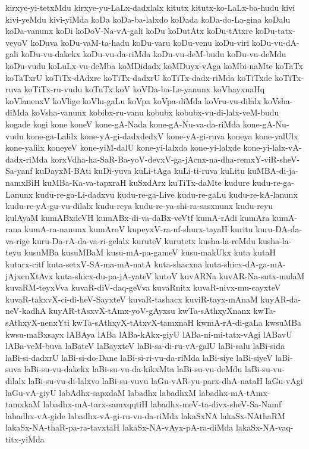 {kirxye-yi-tetxMdu
kirxye-yu-LaLx-dadxlalx
kitutx
kitutx-ko-LaLx-ba-hudu
kivi
kivi-yeMdu
kivi-yiMda
koDa
koDa-ba-lalxdo
koDada
koDa-do-La-gina
koDalu
koDa-vanunx
koDi
koDoV-Na-vA-gali
koDu
koDutAtx
koDu-tAtxre
koDu-tatx-veyoV
koDuva
koDu-vaM-ta-hadu
koDu-varu
koDu-venu
koDu-viri
koDu-vu-dA-gali
koDu-vu-dakekx
koDu-vu-da-riMda
koDu-vu-deM-budu
koDu-vu-deMdu
koDu-vudu
koLuLx-vu-deMba
koMDidadx
koMDuyx-vAga
koMbi-naMte
koTaTx
koTaTxrU
koTiTx-dAdxre
koTiTx-dadxrU
koTiTx-dadx-riMda
koTiTxde
koTiTx-ruva
koTiTx-ru-vudu
koTuTx
koV
koVDa-ba-Le-yanunx
koVhayxnaHq
koVlanenxV
koVlige
koVlu-gaLu
koVpa
koVpa-diMda
koVru-vu-dilalx
koVsha-diMda
koVsha-vanunx
kobibx-ru-vanu
kobubx
kobubx-vu-di-lalx-veM-budu
kogade
kogi
kone
koneV
kone-gA-Nada
kone-gA-Nu-va-da-riMda
kone-gA-Nu-vudu
kone-ga-Lalilx
kone-yA-gi-dadxdedxV
kone-yA-gi-ruva
koneya
kone-yalUlx
kone-yalilx
koneyeV
kone-yiM-dalU
kone-yi-lalxda
kone-yi-lalxde
kone-yi-lalx-vA-dadx-riMda
korxVdha-ha-SaR-Ba-yoV-devxV-ga-jAcnx-na-dha-remxY-viR-sheV-Sa-yanf
kuDayxM-BAti
kuDi-yuva
kuLi-tAga
kuLi-ti-ruva
kuLitu
kuMBA-di-ja-namxBiH
kuMBa-Ka-va-tapxraH
kuSxdArx
kuTiTx-daMte
kudure
kudu-re-ga-Lanunx
kudu-re-ga-Li-dadxvu
kudu-re-ga-Live
kudu-re-gaLu
kudu-re-kA-lanunx
kudu-re-yA-gu-vu-dilalx
kudu-reya
kudu-re-ya-shi-ra-sasxnunx
kudu-reyu
kulAyaM
kumABxdeVH
kumABx-di-va-daBx-veVtf
kumA-rAdi
kumAra
kumA-rana
kumA-ra-nanunx
kumAroV
kupeyxV-ra-nf-shurx-tayaH
kuritu
kuru-DA-da-va-rige
kuru-Da-rA-da-va-ri-gelalx
kuruteV
kurutetx
kusha-la-reMdu
kusha-la-teyu
kusuMBa
kusuMBaM
kusu-mA-pa-gameV
kusu-makUkx
kuta
kutaH
kutarx-citf
kuta-setxV-SA-ma-mA-natA
kuta-shacxna
kuta-shicx-dA-ga-mA-jAjxcnXtAvx
kuta-shicx-du-pa-jA-yateV
kutoV
kuvARNa
kuvAR-Na-sutx-mulaM
kuvaRM-teyxVva
kuvaR-diV-daq-geVva
kuvaRnitx
kuvaR-nivx-mu-cayxteV
kuvaR-takxvX-ci-di-heV-SayxteV
kuvaR-tashacx
kuviR-tayx-mAnaM
kuyAR-da-neV-kadhA
kuyAR-tAsxvX-tAmx-yoV-gAyxsu
kwTa-sAthxyXnanx
kwTa-sAthxyX-nenxYti
kwTa-sAthxyX-tAtxvX-tamxnaH
kwmA-rA-di-gaLa
kwsuMBa
kwsu-maBxsayx
lABAya
lABa
lABa-kAkx-giyU
lABa-ni-mi-tatx-vAgi
lABavU
lABa-veM-buva
laBateV
laBayxteV
laBi-sa-di-ru-vA-galU
laBi-salu
laBi-sida
laBi-si-dadxrU
laBi-si-do-Dane
laBi-si-ri-vu-da-riMda
laBi-siye
laBi-siyeV
laBi-suva
laBi-su-vu-dakekx
laBi-su-vu-da-kikxMta
laBi-su-vu-deMdu
laBi-su-vu-dilalx
laBi-su-vu-di-lalxvo
laBi-su-vuvu
laGu-vAR-yu-parx-dhA-nataH
laGu-vAgi
laGu-vA-giyU
labAdhx-sapxdaM
labadhx
labadhxM
labadhx-mA-tAmx-tamxkaM
labadhx-mA-tarx-samxqqtiH
labadhx-meV-ta-divx-sheV-Sa-Namf
labadhx-vA-gide
labadhx-vA-gi-ru-vu-da-riMda
lakaSxNA
lakaSx-NAthaRM
lakaSx-NA-thaR-pa-ra-tavxtaH
lakaSx-NA-vAyx-pA-ra-diMda
lakaSx-NA-vaq-titx-yiMda
}
